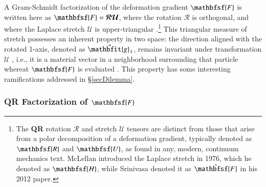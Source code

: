 A Gram-Schmidt factorization of the deformation gradient $\mathbfsf{F}$ is written here as $\mathbfsf{F} = \boldsymbol{\mathcal{RU}}$, where the rotation $\boldsymbol{\mathcal{R}}$ is orthogonal, and where the Laplace stretch $\boldsymbol{\mathcal{U}}$ is upper-triangular \cite{Freedetal19}.\footnote{
	The \textbf{QR} rotation $\boldsymbol{\mathcal{R}}$ and stretch $\boldsymbol{\mathcal{U}}$ tensors are distinct from those that arise from a polar decomposition of a deformation gradient, typically denoted as $\mathbfsf{R}$ and $\mathbfsf{U}$, as found in any, modern, continuum mechanics text.  McLellan \cite{McLellan76,McLellan80} introduced the Laplace stretch in 1976, which he denoted as $\mathbfsf{H}$, while Srinivasa \cite{Srinivasa12} denoted it as $\tilde{\mathbfsf{F}}$ in his 2012 paper.
} 
This triangular measure of stretch possesses an inherent property in two space: the direction aligned with the rotated 1-axis, denoted as $\vec{\mathbfit{g}}_{\hspace{0.5pt}1}$, remains invariant under transformation $\boldsymbol{\mathcal{U}}$ \cite{McLellan80}, i.e., it is a material vector in a neighborhood surrounding that particle whereat $\mathbfsf{F}$ is evaluated \cite{FreedZamani18}.  This property has some interesting ramifications addressed in \S\ref{secDilemma}.

\subsubsection{\textbf{QR} Factorization of\/ $\mathbfsf{F}$}
\label{secQR2D}

